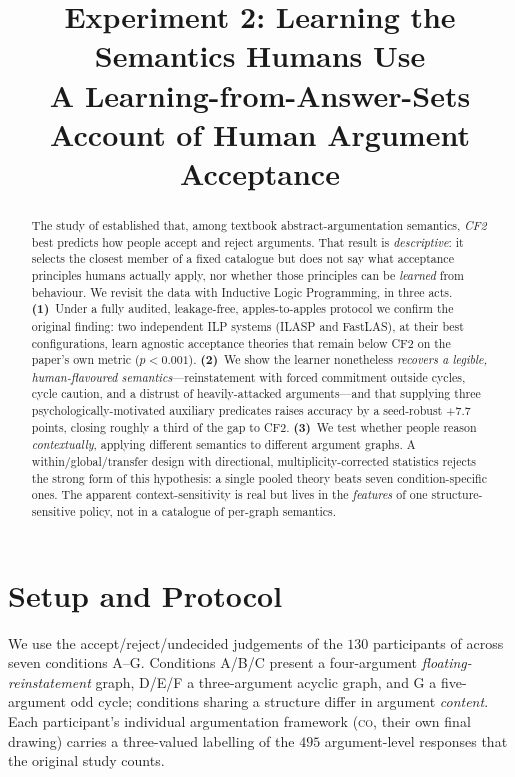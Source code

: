 \documentclass[11pt]{article}
\title{\vspace{-1.5em}\textbf{Experiment 2: Learning the Semantics Humans Use}\\[0.3em]
\large A Learning-from-Answer-Sets Account of Human Argument Acceptance}
\author{}
\date{}
\newcommand{\co}{\textsc{co}}
\begin{document}
\maketitle
\vspace{-3.5em}

\begin{abstract}
\noindent
The study of \citet{guillaume2022} established that, among textbook abstract-argumentation
semantics, \emph{CF2} best predicts how people accept and reject arguments. That result is
\emph{descriptive}: it selects the closest member of a fixed catalogue but does not say what
acceptance principles humans actually apply, nor whether those principles can be \emph{learned}
from behaviour. We revisit the \citeauthor{guillaume2022} data with Inductive Logic Programming,
in three acts. \textbf{(1)}~Under a fully audited, leakage-free, apples-to-apples protocol we
confirm the original finding: two independent ILP systems (ILASP and FastLAS), at their best
configurations, learn agnostic acceptance theories that remain below CF2 on the paper's own metric
($p<0.001$). \textbf{(2)}~We show the learner nonetheless \emph{recovers a legible, human-flavoured
semantics}---reinstatement with forced commitment outside cycles, cycle caution, and a distrust of
heavily-attacked arguments---and that supplying three psychologically-motivated auxiliary predicates
raises accuracy by a seed-robust $+7.7$ points, closing roughly a third of the gap to CF2.
\textbf{(3)}~We test whether people reason \emph{contextually}, applying different semantics to
different argument graphs. A within/global/transfer design with directional, multiplicity-corrected
statistics rejects the strong form of this hypothesis: a single pooled theory beats seven
condition-specific ones. The apparent context-sensitivity is real but lives in the \emph{features}
of one structure-sensitive policy, not in a catalogue of per-graph semantics.
\end{abstract}

\section{Setup and Protocol}
\label{sec:setup}

We use the accept/reject/undecided judgements of the $130$ participants of
\citet{guillaume2022} across seven conditions A--G. Conditions A/B/C present a four-argument
\emph{floating-reinstatement} graph, D/E/F a three-argument acyclic graph, and G a five-argument
odd cycle; conditions sharing a structure differ in argument \emph{content}. Each participant's
individual argumentation framework (\co{}, their own final drawing) carries a three-valued
labelling of the $495$ argument-level responses that the original study counts.
\end{document}

